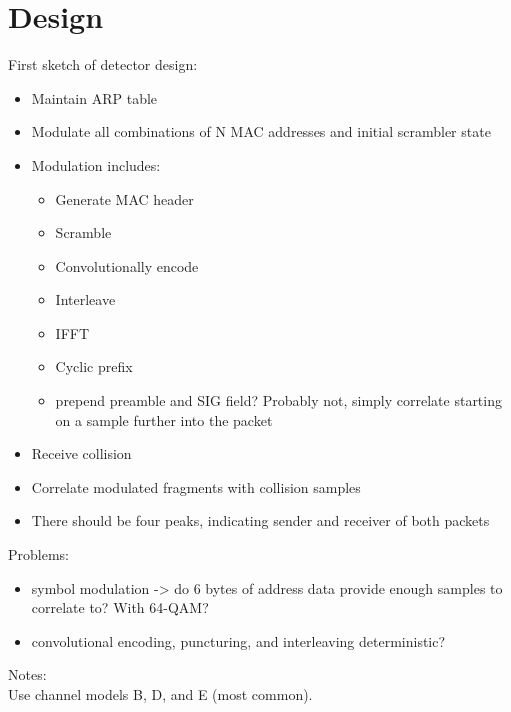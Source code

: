 
\chapter{Design}\label{ch:design}

\glsresetall %


First sketch of detector design:

\begin{itemize}
	\item Maintain ARP table
	\item Modulate all combinations of N MAC addresses and initial scrambler state
	\item Modulation includes:
	\begin{itemize}
		\item Generate MAC header
		\item Scramble
		\item Convolutionally encode
		\item Interleave
		\item IFFT
		\item Cyclic prefix
		\item prepend preamble and SIG field? Probably not, simply correlate starting on a sample further into the packet
	\end{itemize}
	\item Receive collision
	\item Correlate modulated fragments with collision samples
	\item There should be four peaks, indicating sender and receiver of both packets
\end{itemize}

Problems:

\begin{itemize}
	\item symbol modulation -> do 6 bytes of address data provide enough samples to correlate to? With 64-QAM?
	\item convolutional encoding, puncturing, and interleaving deterministic?
\end{itemize}

Notes:\\

Use channel models B, D, and E (most common).